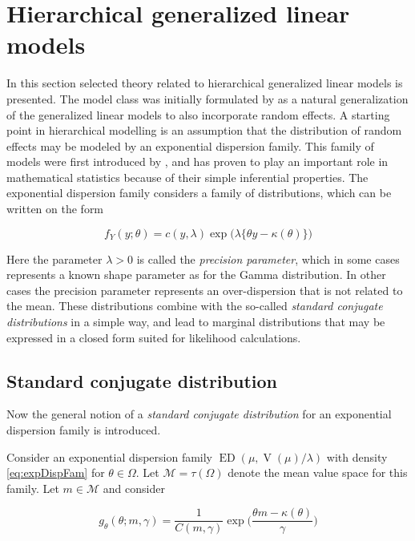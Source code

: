\documentclass[a4paper,twoside,11pt]{report} %
\DeclareMathOperator{\V}{V}
\DeclareMathOperator{\ED}{ED}
\theoremstyle{definition}
\theoremstyle{definition}
\theoremstyle{definition}
\theoremstyle{definition}
\theoremstyle{remark}
\begin{document}
\section{Hierarchical generalized linear models}\label{HLMM}

In this section selected theory related to hierarchical generalized linear models is presented. The model class was initially formulated by \textcite{Lee_1996} as a natural generalization of the generalized linear models to also incorporate random effects. A starting point in hierarchical modelling is an assumption that the distribution of random effects may be modeled by an exponential dispersion family. This family of models were first introduced by \textcite{Fisher_1922}, and has proven to play an important role in mathematical statistics because of their simple inferential properties. The exponential dispersion family considers a family of distributions, which can be written on the form

\begin{equation}\label{eq:expDispFam}
  f_Y(y;\theta)=c(y,\lambda)\exp\big(\lambda \{\theta y-\kappa(\theta) \}\big)
\end{equation}

Here the parameter \(\lambda>0\) is called the \textit{precision parameter}, which in some cases represents a known shape parameter as for the Gamma distribution. In other cases the precision parameter represents an over-dispersion that is not related to the mean. These distributions combine with the so-called \textit{standard conjugate distributions} in a simple way, and lead to marginal distributions that may be expressed in a closed form suited for likelihood calculations.

\subsection{Standard conjugate distribution}

Now the general notion of a \textit{standard conjugate distribution} for an exponential dispersion family is introduced.

Consider an exponential dispersion family \(\ED(\mu, \V(\mu)/\lambda)\) with density \eqref{eq:expDispFam} for \(\theta\in\Omega\). Let \(\mathcal{M}=\tau(\Omega)\) denote the mean value space for this family. Let \(m\in\mathcal{M}\) and consider

\begin{equation}\label{eq:densityTheta}
  g_{\theta}(\theta;m, \gamma)=\frac{1}{C(m,\gamma)}\exp\Big(\frac{\theta m-\kappa(\theta)}{\gamma}\Big)
\end{equation}
\end{document}

